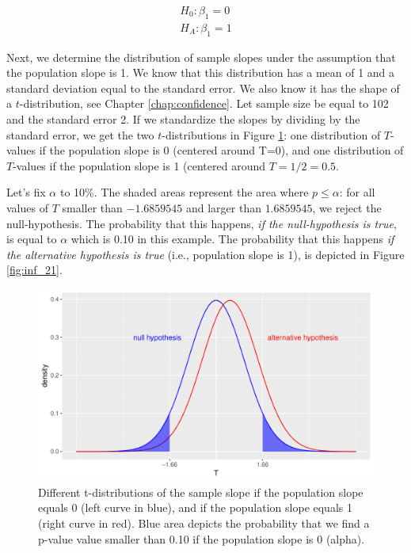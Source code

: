 \documentclass[]{book}\usepackage[]{graphicx}\usepackage[]{color}
\makeatletter
\def\maxwidth{ %
  \ifdim\Gin@nat@width>\linewidth
    \linewidth
  \else
    \Gin@nat@width
  \fi
}
\newenvironment{knitrout}{}{} %
\makeatother
\begin{document}
\begin{eqnarray}
H_0: \beta_1 =0 \nonumber \\
H_A: \beta_1 = 1\nonumber
\end{eqnarray}


Next, we determine the distribution of sample slopes under the assumption that the population slope is 1. We know that this distribution has a mean of 1 and a standard deviation equal to the standard error. We also know it has the shape of a $t$-distribution, see Chapter \ref{chap:confidence}. Let sample size be equal to 102 and the standard error 2. If we standardize the slopes by dividing by the standard error, we get the two $t$-distributions in Figure \ref{fig:inf_20}: one distribution of $T$-values if the population slope is 0 (centered around T=0), and one distribution of $T$-values if the population slope is 1 (centered around $T=1/2=0.5$.

Let's fix $\alpha$ to 10\%. The shaded areas represent the area where $p \leq \alpha$: for all values of $T$ smaller than $-1.6859545$ and larger than $1.6859545$, we reject the null-hypothesis. The probability that this happens, \textit{if the null-hypothesis is true}, is equal to $\alpha$ which is 0.10 in this example. The probability that this happens \textit{if the alternative hypothesis is true} (i.e., population slope is 1), is depicted in Figure \ref{fig:inf_21}.


\begin{knitrout}
\color{fgcolor}\begin{figure}

{\centering \includegraphics[width=\maxwidth]{figure/inf_20-1} 

}

\caption[Different t-distributions of the sample slope if the population slope equals 0 (left curve in blue), and if the population slope equals 1 (right curve in red)]{Different t-distributions of the sample slope if the population slope equals 0 (left curve in blue), and if the population slope equals 1 (right curve in red). Blue area depicts the probability that we find a p-value value smaller than 0.10 if the population slope is 0 (alpha).}\label{fig:inf_20}
\end{figure}


\end{knitrout}
\end{document}
